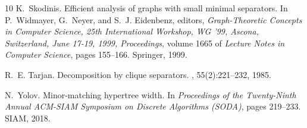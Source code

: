 \documentclass[11pt]{article}
\theoremstyle{definition}
\begin{document}
\begin{thebibliography}{10}
K.~Skodinis.
\newblock Efficient analysis of graphs with small minimal separators.
\newblock In P.~Widmayer, G.~Neyer, and S.~J. Eidenbenz, editors, {\em
  Graph-Theoretic Concepts in Computer Science, 25th International Workshop,
  {WG} '99, Ascona, Switzerland, June 17-19, 1999, Proceedings}, volume 1665 of
  {\em Lecture Notes in Computer Science}, pages 155--166. Springer, 1999.

R.~E. Tarjan.
\newblock Decomposition by clique separators.
, 55(2):221--232, 1985.

N.~Yolov.
\newblock Minor-matching hypertree width.
\newblock In {\em Proceedings of the Twenty-Ninth Annual {ACM-SIAM} Symposium
  on Discrete Algorithms (SODA)}, pages 219--233. {SIAM}, 2018.

\end{thebibliography}
\end{document}
